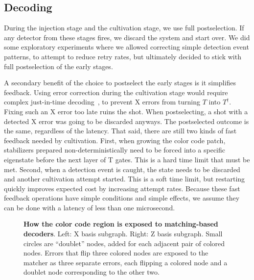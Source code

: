 \documentclass[onecolumn,unpublished,a4paper]{quantumarticle}
\theoremstyle{definition}
\begin{document}
\subsection{Decoding}
\label{sec:decoding}

During the injection stage and the cultivation stage, we use full postselection.
If any detector from these stages fires, we discard the system and start over.
We did some exploratory experiments where we allowed correcting simple detection event patterns, to attempt to reduce retry rates, but ultimately decided to stick with full postselection of the early stages.

A secondary benefit of the choice to postselect the early stages is it simplifies feedback.
Using error correction during the cultivation stage would require complex just-in-time decoding~\cite{chamberland2020colorinjection}, to prevent X errors from turning $T$ into $T^\dagger$.
Fixing such an X error too late ruins the shot.
When postselecting, a shot with a detected X error was going to be discarded anyways.
The postselected outcome is the same, regardless of the latency.
That said, there are still two kinds of fast feedback needed by cultivation.
First, when growing the color code patch, stabilizers prepared non-deterministically need to be forced into a specific eigenstate before the next layer of T gates.
This is a hard time limit that must be met.
Second, when a detection event is caught, the state needs to be discarded and another cultivation attempt started.
This is a soft time limit, but restarting quickly improves expected cost by increasing attempt rates.
Because these fast feedback operations have simple conditions and simple effects, we assume they can be done with a latency of less than one microsecond.

\begin{figure}
    \centering
    \caption{
        \textbf{How the color code region is exposed to matching-based decoders}.
        Left: X basis subgraph.
        Right: Z basis subgraph.
        Small circles are ``doublet'' nodes, added for each adjacent pair of colored nodes.
        Errors that flip three colored nodes are exposed to the matcher as three separate errors, each flipping a colored node and a doublet node corresponding to the other two.
    }
    \label{fig:color-code-for-matcher}
\end{figure}
\end{document}
